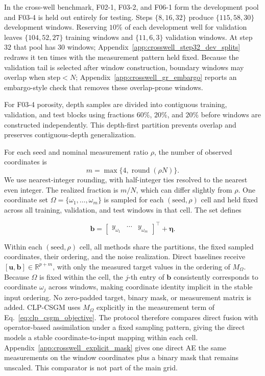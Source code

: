 In the cross-well benchmark, F02-1, F03-2, and F06-1 form the development pool
and F03-4 is held out entirely for testing. Steps $\{8,16,32\}$ produce
$\{115,58,30\}$ development windows. Reserving $10\%$ of each development well
for validation leaves $\{104,52,27\}$ training windows and $\{11,6,3\}$
validation windows. At step $32$ that pool has $30$ windows;
Appendix~\ref{app:crosswell_step32_dev_splits} redraws it ten times with the
measurement pattern held fixed. Because the validation tail is
selected after window construction, boundary windows may overlap when
$\mathrm{step}<N$; Appendix~\ref{app:crosswell_gr_embargo} reports an
embargo-style check that removes these overlap-prone windows.

For F03-4 porosity, depth samples are divided into contiguous training,
validation, and test blocks using fractions $60\%$, $20\%$, and $20\%$ before
windows are constructed independently. This depth-first partition prevents
overlap and preserves contiguous-depth generalization.

For each seed and nominal measurement ratio $\rho$, the number of observed
coordinates is
\[
m=\max\{4,\operatorname{round}(\rho N)\}.
\]
We use nearest-integer rounding, with half-integer ties resolved to the nearest
even integer. The realized fraction is $m/N$, which can differ slightly from
$\rho$. One coordinate set
$\Omega=\{\omega_1,\ldots,\omega_m\}$ is sampled for each
$(\mathrm{seed},\rho)$ cell and held fixed across all training, validation, and
test windows in that cell. The set defines

\begin{equation}
\boldsymbol{b}
=
\begin{bmatrix}
y_{\omega_1} & \cdots & y_{\omega_m}
\end{bmatrix}^{\top}
+
\boldsymbol{\eta}.
\label{eq:experimental_sparse_measurements}
\end{equation}

Within each $(\mathrm{seed},\rho)$ cell, all methods share the partitions, the
fixed sampled coordinates, their ordering, and the noise realization. Direct
baselines receive
$[\boldsymbol{u},\boldsymbol{b}]\in\mathbb{R}^{p+m}$, with only the measured
target values in the ordering of $M_{\Omega}$. Because $\Omega$ is fixed within
the cell, the $j$-th entry of $\boldsymbol{b}$ consistently corresponds to
coordinate $\omega_j$ across windows, making coordinate identity implicit in
the stable input ordering. No zero-padded target, binary mask, or measurement
matrix is added. CLP-CSGM uses $M_{\Omega}$ explicitly in the measurement
term of Eq.~\eqref{eq:clp_csgm_objective}. The protocol therefore
compares direct fusion with operator-based assimilation under a fixed sampling
pattern, giving the direct models a stable coordinate-to-input mapping within
each cell. Appendix~\ref{app:crosswell_explicit_mask} gives one direct AE the
same measurements on the window coordinates plus a binary mask that remains
unscaled. This comparator is not part of the main grid.

